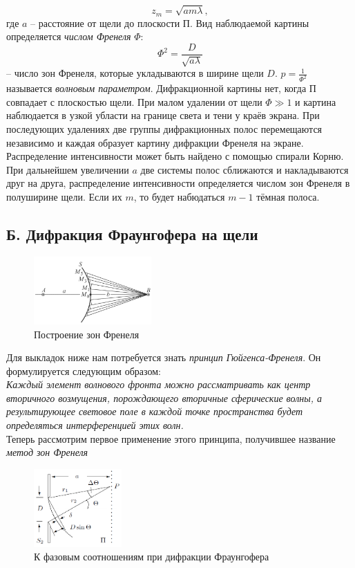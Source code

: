 \documentclass[a4paper,12pt]{article}
\begin{document}
\begin{equation}
z_m = \sqrt{am\lambda},
\end{equation}
где $a$ -- расстояние от щели до плоскости П. Вид наблюдаемой картины определяется \textit{числом Френеля} $\Phi$:
$$
\Phi^2 = \dfrac{D}{\sqrt{a\lambda}}
$$
-- число зон Френеля, которые укладываются в ширине щели $D$. $p = \frac{1}{\Phi^2}$ называется \textit{волновым параметром}. Дифракционной картины нет, когда П совпадает с плоскостью щели. При малом удалении от щели $\Phi \gg 1$ и картина наблюдается в узкой убласти на границе света и тени у краёв экрана. При последующих удалениях две группы дифракционных полос перемещаются независимо и каждая образует картину дифракции Френеля на экране. Распределение интенсивности может быть найдено с помощью спирали Корню. При дальнейшем увеличении $a$ две системы полос сближаются и накладываются друг на друга, распределение интенсивности определяется числом зон Френеля в полуширине щели. Если их $m$, то будет набюдаться $m-1$ тёмная полоса.
\subsection*{Б. Дифракция Фраунгофера на щели}
\begin{figure}
  \begin{center}
    \includegraphics[width = 0.4\textwidth]{2.png}
  \end{center}
  \caption{Построение зон Френеля}
\end{figure}
Для выкладок ниже нам потребуется знать \textit{принцип Гюйгенса-Френеля}. Он формулируется следующим образом:\\
\textit{Каждый элемент волнового фронта можно рассматривать как центр  вторичного возмущения, порождающего вторичные сферические волны, а результирующее световое поле  в каждой точке пространства будет определяться интерференцией этих волн.}\\
Теперь рассмотрим первое применение этого принципа, получившее название \textit{метод зон Френеля}

\begin{figure}
  \begin{center}
    \includegraphics[width = 0.3\textwidth]{1.png}
  \end{center}
  \caption{К фазовым соотношениям при дифракции Фраунгофера}
  \vspace{+30pt}
\end{figure}
\end{document}
